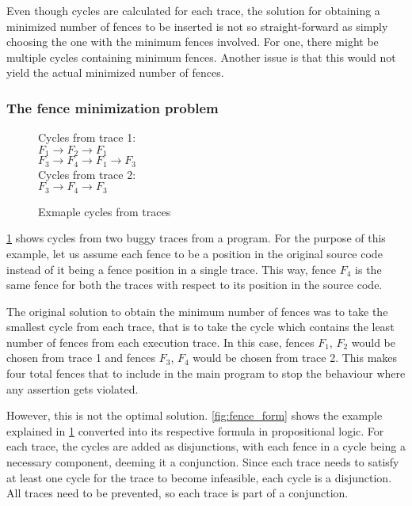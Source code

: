 \par
Even though cycles are calculated for each trace, the solution for obtaining a minimized number of fences to be inserted is not so straight-forward as simply choosing the one with the minimum fences involved. For one, there might be multiple cycles containing minimum fences. Another issue is that this would not yield the actual minimized number of fences. 

\subsubsection{The fence minimization problem}
\begin{figure}
\begin{center}
	Cycles from trace 1:\\
	\textit{$F_1 \rightarrow F_2 \rightarrow F_1$}\\
	\textit{$F_3 \rightarrow F_4 \rightarrow F_1 \rightarrow F_3$}\\
	Cycles from trace 2:\\
	\textit{$F_3 \rightarrow F_4 \rightarrow F_3$}
	\caption{Exmaple cycles from traces}
	\label{fig:fence_min}
\end{center}
\end{figure}

\ref{fig:fence_min} shows cycles from two buggy traces from a program. For the purpose of this example, let us assume each fence to be a position in the original source code instead of it being a fence position in a single trace. This way, fence \textit{$F_4$} is the same fence for both the traces with respect to its position in the source code.

\par
The original solution to obtain the minimum number of fences was to take the smallest cycle from each trace, that is to take the cycle which contains the least number of fences from each execution trace. In this case, fences \textit{$F_1$}, \textit{$F_2$} would be chosen from trace 1 and fences \textit{$F_3$}, \textit{$F_4$} would be chosen from trace 2. This makes four total fences that to include in the main program to stop the behaviour where any assertion gets violated.

\par
However, this is not the optimal solution. \ref{fig:fence_form} shows the example explained in \ref{fig:fence_min} converted into its respective formula in propositional logic. For each trace, the cycles are added as disjunctions, with each fence in a cycle being a necessary component, deeming it a conjunction. Since each trace needs to satisfy at least one cycle for the trace to become infeasible, each cycle is a disjunction. All traces need to be prevented, so each trace is part of a conjunction.

